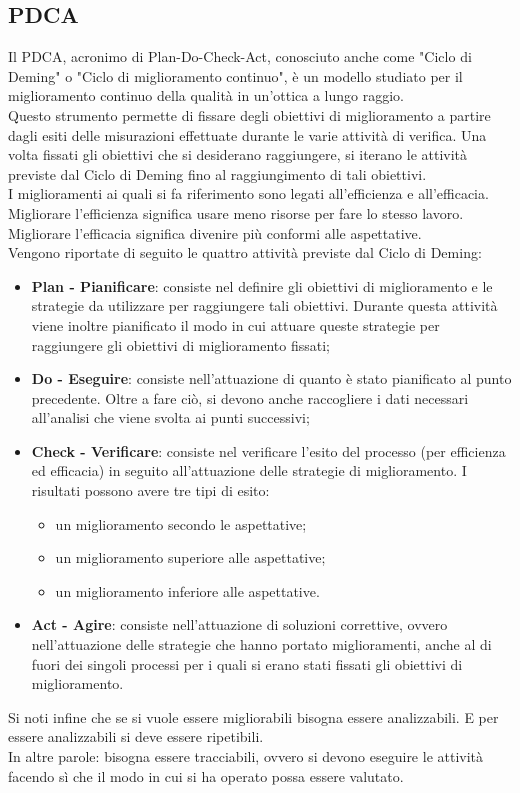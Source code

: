 \documentclass[../PianoDiQualifica.tex]{subfiles}
\begin{document}
\begin{appendices}

\section{PDCA}
	Il PDCA, acronimo di Plan-Do-Check-Act, conosciuto anche come "Ciclo di Deming" o "Ciclo di miglioramento continuo", è un modello studiato per il miglioramento continuo della qualità in un'ottica a lungo raggio.\\
	Questo strumento permette di fissare degli obiettivi di miglioramento a partire dagli esiti delle misurazioni effettuate durante le varie attività di verifica. Una volta fissati gli obiettivi che si desiderano raggiungere, si iterano le attività previste dal Ciclo di Deming fino al raggiungimento di tali obiettivi.\\
	I miglioramenti ai quali si fa riferimento sono legati all'efficienza e all'efficacia. Migliorare l'efficienza significa usare meno risorse per fare lo stesso lavoro. Migliorare l'efficacia significa divenire più conformi alle aspettative.\\
	Vengono riportate di seguito le quattro attività previste dal Ciclo di Deming:
	\begin{itemize}
		\item \textbf{Plan - Pianificare}: consiste nel definire gli obiettivi di miglioramento e le strategie da utilizzare per raggiungere tali obiettivi. Durante questa attività viene inoltre pianificato il modo in cui attuare queste strategie per raggiungere gli obiettivi di miglioramento fissati;
		\item \textbf{Do - Eseguire}: consiste nell'attuazione di quanto è stato pianificato al punto precedente. Oltre a fare ciò, si devono anche raccogliere i dati necessari all’analisi che viene svolta ai punti successivi;
		\item \textbf{Check - Verificare}: consiste nel verificare l'esito del processo (per efficienza ed efficacia) in seguito all'attuazione delle strategie di miglioramento. I risultati possono avere tre tipi di esito:
		\begin{itemize}
			\item un miglioramento secondo le aspettative;
			\item un miglioramento superiore alle aspettative;
			\item un miglioramento inferiore alle aspettative.
		\end{itemize}
		\item \textbf{Act - Agire}: consiste nell'attuazione di soluzioni correttive, ovvero nell'attuazione delle strategie che hanno portato miglioramenti, anche al di fuori dei singoli processi per i quali si erano stati fissati gli obiettivi di miglioramento.
	\end{itemize}
	Si noti infine che se si vuole essere migliorabili bisogna essere analizzabili. E per essere analizzabili si deve essere ripetibili.\\
	In altre parole: bisogna essere tracciabili, ovvero si devono eseguire le attività facendo sì che il modo in cui si ha operato possa essere valutato.
	
\end{appendices}
\end{document}

